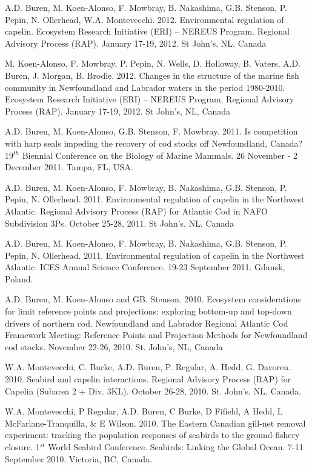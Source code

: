 \documentclass{res}
\begin{document}
\begin{resume}
\begin{hangparas}{.4in}{1}
A.D. Buren, M. Koen-Alonso, F. Mowbray, B. Nakashima, G.B. Stenson, P. Pepin, N. Ollerhead, W.A. Montevecchi. 2012. Environmental regulation of capelin. Ecosystem Research Initiative (ERI) – NEREUS Program. Regional Advisory Process (RAP). January 17-19, 2012. St John's, NL, Canada

M. Koen-Alonso, F. Mowbray, P. Pepin, N. Wells, D. Holloway, B. Vaters, A.D. Buren, J. Morgan, B. Brodie. 2012. Changes in the structure of the marine fish community in Newfoundland and Labrador waters in the period 1980-2010. Ecosystem Research Initiative (ERI) – NEREUS Program. Regional Advisory Process (RAP). January 17-19, 2012. St John's, NL, Canada

A.D. Buren, M. Koen-Alonso, G.B. Stenson, F. Mowbray. 2011. Is competition with harp seals impeding the recovery of cod stocks off Newfoundland, Canada? 19$^{th}$ Biennial Conference on the Biology of Marine Mammals. 26 November - 2 December 2011. Tampa, FL, USA.

A.D. Buren, M. Koen-Alonso, F. Mowbray, B. Nakashima, G.B. Stenson, P. Pepin, N. Ollerhead. 2011. Environmental regulation of capelin in the Northwest Atlantic. Regional Advisory Process (RAP) for Atlantic Cod in NAFO Subdivision 3Ps. October 25-28, 2011. St John's, NL, Canada

A.D. Buren, M. Koen-Alonso, F. Mowbray, B. Nakashima, G.B. Stenson, P. Pepin, N. Ollerhead. 2011. Environmental regulation of capelin in the Northwest Atlantic. ICES Annual Science Conference. 19-23 September 2011. Gdansk, Poland.

A.D. Buren, M. Koen-Alonso and GB. Stenson. 2010. Ecosystem considerations for limit reference points and projections: exploring bottom-up and top-down drivers of northern cod. Newfoundland and Labrador Regional Atlantic Cod Framework Meeting: Reference Points and Projection Methods for Newfoundland cod stocks. November 22-26, 2010. St. John’s, NL, Canada

W.A. Montevecchi, C. Burke, A.D. Buren, P. Regular, A. Hedd, G. Davoren. 2010. Seabird and capelin interactions. Regional Advisory Process (RAP) for Capelin (Subarea 2 + Div. 3KL). October 26-28, 2010. St. John’s, NL, Canada. 

W.A. Montevecchi, P Regular, A.D. Buren, C Burke, D Fifield, A Hedd, L McFarlane-Tranquilla, \& E Wilson. 2010. The Eastern Canadian gill-net removal experiment: tracking the population responses of seabirds to the ground-fishery closure. 1$^{st}$ World Seabird Conference. Seabirds: Linking the Global Ocean. 7-11 September 2010. Victoria, BC, Canada.


\end{hangparas}
\end{resume}
\end{document}
